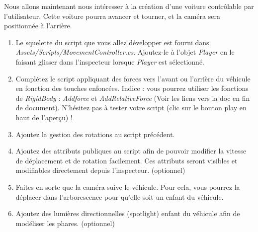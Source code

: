 Nous allons maintenant nous intéresser à la création d'une voiture contrôlable par l'utilisateur. Cette voiture pourra avancer et tourner, et la caméra sera positionnée à l'arrière.

\begin{enumerate}
\item Le squelette du script que vous allez développer est fourni dans \textit{Assets/Scripts/MovementController.cs}. Ajoutez-le à l'objet \textit{Player} en le faisant glisser dans l'inspecteur lorsque \textit{Player} est sélectionné. 
\item Complétez le script appliquant des forces vers l'avant ou l'arrière du véhicule en fonction des touches enfoncées. Indice : vous pourrez utiliser les fonctions de \textit{RigidBody} : \textit{Addforce} et \textit{AddRelativeForce} (Voir les liens vers la doc en fin de document). N'hésitez pas à tester votre script (clic sur le bouton play en haut de l'aperçu) !
\item Ajoutez la gestion des rotations au script précédent.
\item Ajoutez des attributs publiques au script afin de pouvoir modifier la vitesse de déplacement et de rotation facilement. Ces attributs seront visibles et modifiables directement depuis l'inspecteur. (optionnel)
\item Faites en sorte que la caméra suive le véhicule. Pour cela, vous pourrez la déplacer dans l'arborescence pour qu'elle soit un enfant du véhicule.
\item Ajoutez des lumières directionnelles (spotlight) enfant du véhicule afin de modéliser les phares. (optionnel)
\end{enumerate}